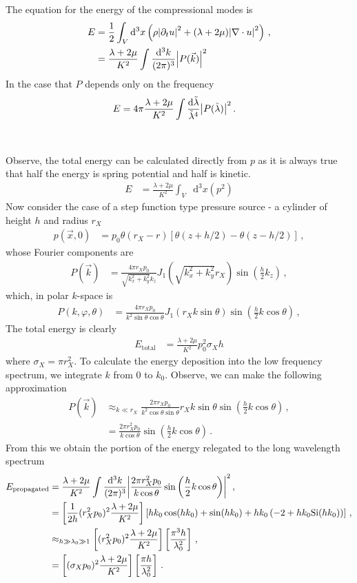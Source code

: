 \documentclass{article}
\newcommand*\diff{\mathop{}\!\mathrm{d}}
\newcommand*\te[1]{\text{#1}}
\newcommand*\p[1]{\left(#1\right)}
\newcommand*\ps[1]{\left[#1\right]}
\newcommand*\f[2]{\frac{#1}{#2}}
\begin{document}
The equation for the energy of the compressional modes is
\begin{align}
E&=\f12\int_V\diff^3x\p{\rho\abs{\partial_t u}^2+(\lambda+2\mu)\abs{\nabla\cdot u}^2}\,,\\
&=\f{\lambda+2\mu}{K^2}\int\f{\diff^3 k}{(2\pi)^3}\abs{P(\vec k)}^2
\end{align}
In the case that $P$ depends only on the frequency
\begin{align}
E&=4\pi\f{\lambda+2\mu}{K^2}\int\f{\diff\tilde\lambda}{\tilde\lambda^4}\abs{P(\tilde\lambda)}^2\,.
\end{align}
\\\\
Observe, the total energy can be calculated directly from $p$ as it is always true that half the energy is spring potential and half is kinetic.
\begin{align}
E&=\f{\lambda+2\mu}{K^2}\int_V\diff^3 x (p^2)
\end{align}
Now consider the case of a step function type pressure source - a cylinder of height $h$ and radius $r_X$
\begin{align}
p(\vec x,0)&=p_0\theta(r_X-r)\ps{\theta(z+h/2)-\theta(z-h/2)}\,,
\end{align}
whose Fourier components are
\begin{align}
P(\vec k)&=\f{4\pi r_X p_0}{\sqrt{k_x^2+k_y^2}k_z}J_1\p{\sqrt{k_x^2+k_y^2}r_X}\sin\p{\f{h}{2}k_z}\,,
\end{align}
which, in polar $k$-space is
\begin{align}
P(k,\varphi,\theta)&=\f{4\pi r_X p_0}{k^2\sin\theta\cos\theta}J_1\p{r_Xk\sin\theta}\sin\p{\f{h}{2}k\cos\theta}\,,
\end{align}
The total energy is clearly
\begin{align}
E_{\te{total}}&=\f{\lambda+2\mu}{K^2}p_0^2\sigma_Xh
\end{align}
where $\sigma_X=\pi r_X^2$. To calculate the energy deposition into the low frequency spectrum, we integrate $k$ from $0$ to $k_0$. Observe, we can make the following approximation
\begin{align}
P(\vec k)&\approx_{k\ll r_X}\f{2\pi r_Xp_0}{k^2\cos\theta\sin\theta}r_X k\sin\theta\sin\p{\f{h}{2}k\cos\theta}\,,\\
&=\f{2\pi r_X^2 p_0}{k\cos\theta}\sin\p{\f{h}{2}k\cos\theta}\,.
\end{align}
From this we obtain the portion of the energy relegated to the long wavelength spectrum
\begin{align}
E_{\te{propagated}}&=\f{\lambda+2\mu}{K^2}\int\f{\diff^3 k}{(2\pi)^3}\abs{\f{2\pi r_X^2 p_0}{k\cos\theta}\sin\p{\f{h}{2}k\cos\theta}}^2\,,\\
&=\ps{\f{1}{2h}(r_X^2p_0)^2\f{\lambda+2\mu}{K^2}}\ps{hk_0\cos(hk_0)+\sin(hk_0)+hk_0\p{-2+hk_0\te{Si}(hk_0)}}\,,\\
&\approx_{h\gg\lambda_0\gg1}\ps{(r_X^2p_0)^2\f{\lambda+2\mu}{K^2}}\ps{\f{\pi^3 h}{\lambda_0^2}}\,,\\
&=\ps{(\sigma_Xp_0)^2\f{\lambda+2\mu}{K^2}}\ps{\f{\pi h}{\lambda_0^2}}\,.
\end{align}
\end{document}
